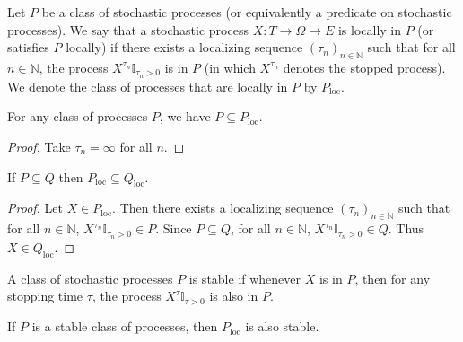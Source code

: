 \begin{definition}\label{def:locally}
  \mathlibok
Let $P$ be a class of stochastic processes (or equivalently a predicate on stochastic processes).
We say that a stochastic process $X : T \to \Omega \to E$ is locally in $P$ (or satisfies $P$ locally) if there exists a localizing sequence $(\tau_n)_{n \in \mathbb{N}}$ such that for all $n \in \mathbb{N}$, the process $X^{\tau_n}\mathbb{I}_{\tau_n > 0}$ is in $P$ (in which $X^{\tau_n}$ denotes the stopped process).
We denote the class of processes that are locally in $P$ by $P_{\mathrm{loc}}$.
\end{definition}


\begin{lemma}\label{lem:implies_locally}
  \mathlibok
For any class of processes $P$, we have $P \subseteq P_{\mathrm{loc}}$.
\end{lemma}

\begin{proof}\leanok
Take $\tau_n = \infty$ for all $n$.
\end{proof}


\begin{lemma}\label{lem:locally_mono}
  \mathlibok
If $P \subseteq Q$ then $P_{\mathrm{loc}} \subseteq Q_{\mathrm{loc}}$.
\end{lemma}

\begin{proof}\leanok
Let $X \in P_{\mathrm{loc}}$.
Then there exists a localizing sequence $(\tau_n)_{n \in \mathbb{N}}$ such that for all $n \in \mathbb{N}$, $X^{\tau_n}\mathbb{I}_{\tau_n > 0} \in P$.
Since $P \subseteq Q$, for all $n \in \mathbb{N}$, $X^{\tau_n}\mathbb{I}_{\tau_n > 0} \in Q$.
Thus $X \in Q_{\mathrm{loc}}$.
\end{proof}


\begin{definition}\label{def:stable}
  \mathlibok
A class of stochastic processes $P$ is stable if whenever $X$ is in $P$, then for any stopping time $\tau$, the process $X^{\tau}\mathbb{I}_{\tau > 0}$ is also in $P$.
\end{definition}


\begin{lemma}\label{lem:isStable_locally}
  \mathlibok
If $P$ is a stable class of processes, then $P_{\mathrm{loc}}$ is also stable.
\end{lemma}

